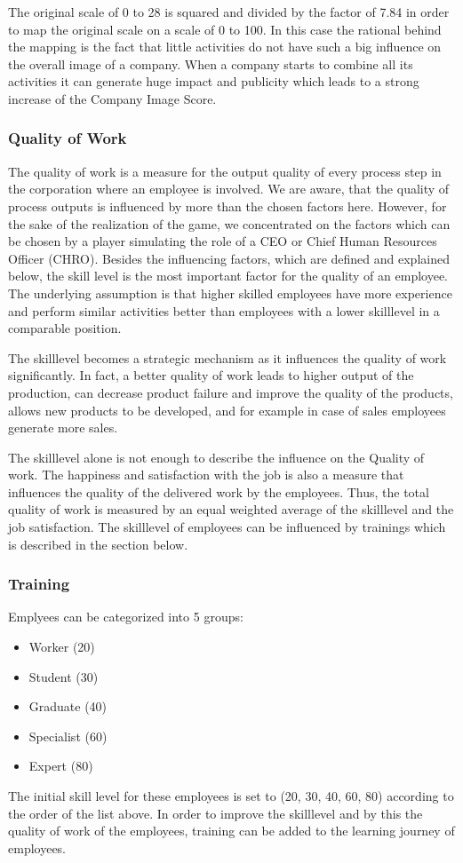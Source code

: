 The original scale of 0 to 28 is squared and divided by the factor of 7.84 in order to map the original scale on a scale of 0 to 100. In this case the rational behind the mapping is the fact that little activities do not have such  a big influence on the overall image of a company. When a company starts to combine all its activities it can generate huge impact and publicity which leads to a strong increase of the Company Image Score.

\subsubsection{Quality of Work}
The quality of work is a measure for the output quality of every process step in the corporation where an employee is involved. We are aware, that the quality of process outputs is influenced by more than the chosen factors here. However, for the sake of the realization of the game, we concentrated on the factors which can be chosen by a player simulating the role of a CEO or Chief Human Resources Officer (CHRO). Besides the influencing factors, which are defined and explained below, the skill level is the most important factor for the quality of an employee. The underlying assumption is that higher skilled employees have more experience and perform similar activities better than employees with a lower skilllevel in a comparable position.

The skilllevel becomes a strategic mechanism as it influences the quality of work significantly. In fact, a better quality of work leads to higher output of the production, can decrease product failure and improve the quality of the products, allows new products to be developed, and for example in case of sales employees generate more sales. 

The skilllevel alone is not enough to describe the influence on the Quality of work. The happiness and satisfaction with the job is also a measure that influences the quality of the delivered work by the employees.
Thus, the total quality of work is measured by an equal weighted average of the skilllevel and the job satisfaction. The skilllevel of employees can be influenced by trainings which is described in the section below.

\subsubsection{Training}
Emplyees can be categorized into 5 groups:
\begin{itemize}
    \item Worker (20)
    \item Student (30)
    \item Graduate (40)
    \item Specialist (60)
    \item Expert (80)
\end{itemize}
The initial skill level for these employees is set to (20, 30, 40, 60, 80) according to the order of the list above. In order to improve the skilllevel and by this the quality of work of the employees, training can be added to the learning journey of employees. 

